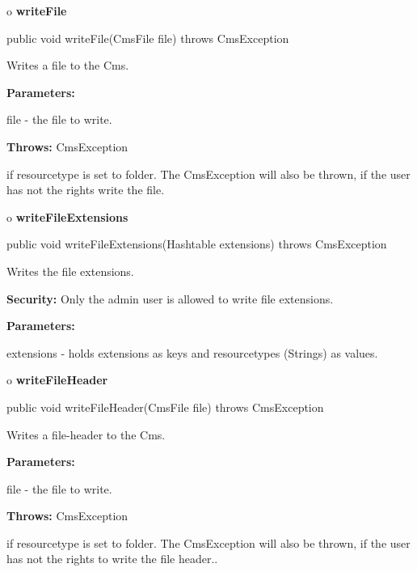 o {\bf writeFile}

\begin{PRE}
 public void writeFile(CmsFile file) throws CmsException
\end{PRE}

\begin{description}
\htmlDD Writes a file to the Cms.

\begin{description}
\item {\bf Parameters:}

file - the file to write.
\item {\bf Throws:} CmsException

if resourcetype is set to folder. The CmsException will also be thrown, if the
user has not the rights write the file.
\end{description}

\end{description}

o {\bf writeFileExtensions}

\begin{PRE}
 public void writeFileExtensions(Hashtable extensions) throws CmsException
\end{PRE}

\begin{description}
\htmlDD Writes the file extensions.

{\bf Security:} Only the admin user is allowed to write file extensions.

\begin{description}
\item {\bf Parameters:}

extensions - holds extensions as keys and resourcetypes (Strings) as values.
\end{description}

\end{description}

o {\bf writeFileHeader}

\begin{PRE}
 public void writeFileHeader(CmsFile file) throws CmsException
\end{PRE}

\begin{description}
\htmlDD Writes a file-header to the Cms.

\begin{description}
\item {\bf Parameters:}

file - the file to write.
\item {\bf Throws:} CmsException

if resourcetype is set to folder. The CmsException will also be thrown, if the
user has not the rights to write the file header..
\end{description}

\end{description}

